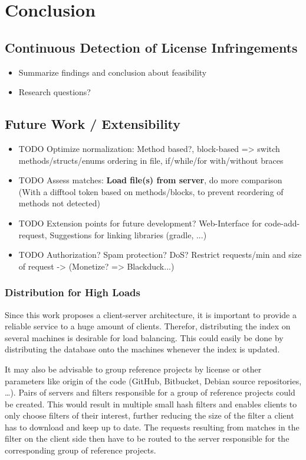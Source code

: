 
\chapter{Conclusion}\label{chapter:conclusion}

\section{Continuous Detection of License Infringements}
\begin{itemize}
	\item Summarize findings and conclusion about feasibility
	\item Research questions?
\end{itemize}

\section{Future Work / Extensibility}\label{section:approach/extensibility}
\begin{itemize}
	\item TODO Optimize normalization: Method based?, block-based => switch methods/structs/enums ordering in file, if/while/for with/without braces
	\item TODO Assess matches: \textbf{Load file(s) from server}, do more comparison (With a difftool token based on methods/blocks, to prevent reordering of methods not detected)
	\item TODO Extension points for future development? Web-Interface for code-add-request, Suggestions for linking libraries (gradle, ...)
	\item TODO Authorization? Spam protection? DoS? Restrict requests/min and size of request -> (Monetize? => Blackduck...)
\end{itemize}

\subsection{Distribution for High Loads}
Since this work proposes a client-server architecture, it is important to provide a reliable service to a huge amount of clients.
Therefor, distributing the index on several machines is desirable for load balancing.
This could easily be done by distributing the database onto the machines whenever the index is updated.

It may also be advisable to group reference projects by license or other parameters like origin of the code (GitHub, Bitbucket, Debian source repositories, \dots).
Pairs of servers and filters responsible for a group of reference projects could be created.
This would result in multiple small hash filters and enables clients to only choose filters of their interest, further reducing the size of the filter a client has to download and keep up to date.
The requests resulting from matches in the filter on the client side then have to be routed to the server responsible for the corresponding group of reference projects.

